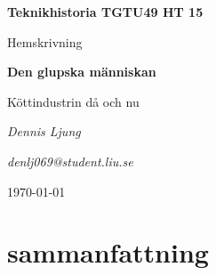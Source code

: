\documentclass[titlepage, a4paper]{article}
\begin{document}
\begin{titlepage}
	\centering
	\vspace*{45mm}
	 \LARGE \textbf{Teknikhistoria TGTU49 HT 15} \par
	 \vspace{5mm}
	 \Large Hemskrivning \par
	 \vspace{10mm}
	 \Huge \textbf{Den glupska människan} \par
	 \vspace{5mm}
	 \huge Köttindustrin då och nu \par
	 \vspace{15mm}
	 \Large \emph{Dennis Ljung} \par
	 \vspace{5mm}
	 \large \emph{denlj069@student.liu.se} \par
	 \vfill
	 {\large \today\par}	
\end{titlepage}


\tableofcontents
\thispagestyle{empty}
\newpage

\section{sammanfattning}
\end{document}
